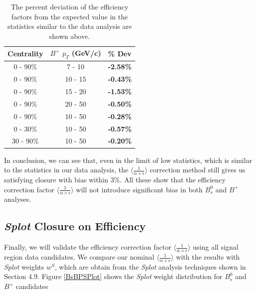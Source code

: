 \begin{table}[h]
\begin{center}
\caption{The  percent deviation of the efficiency factors from the expected value in the statistics similar to the data analysis are shown above.}
\vspace{1em}
\label{BPEffClosure}
  \begin{tabular}{| c | c |c |}
    \hline
     Centrality &   $B^+$  $p_T$ (GeV/c) &   \% Dev \\
    \hline
    \hline
0 - 90\% & 7 - 10 &  \textbf{-2.58\% }   \\ 
0 - 90\% & 10 - 15 &  \textbf{-0.43\% }   \\ 
0 - 90\% & 15 - 20 &   \textbf{-1.53\% }   \\ 
0 - 90\% & 20 - 50 &  \textbf{-0.50\% }   \\ 
0 - 90\% & 10 - 50 &  \textbf{-0.28\% }   \\ 
0 - 30\% & 10 - 50 &   \textbf{-0.57\% }   \\ 
30 - 90\% & 10 - 50 & \textbf{-0.20\% }   \\ 
    \hline
    \hline
\end{tabular}
\end{center}
\end{table}


In conclusion, we can see that, even in the limit of low statistics, which is similar to the statistics in our data analysis, the $\langle \frac{1}{\alpha \times \epsilon} \rangle$ correction method still gives us satisfying closure with bias within 3\%. All these show that the efficiency correction factor $\langle \frac{1}{\alpha \times \epsilon} \rangle$ will not introduce significant bias in both $B^0_s$ and $B^+$ analyses.


\subsection{\textit{Splot} Closure on Efficiency}

Finally, we will validate the efficiency correction factor $\langle \frac{1}{\alpha \times \epsilon} \rangle$ using all signal region data candidates. We compare our nominal $\langle \frac{1}{\alpha \times \epsilon} \rangle$ with the results with \textit{Splot} weights $w^S$, which are obtain from the \textit{Splot} analysis techniques shown in Section 4.9. Figure \ref{BsBPSPlot} shows the \textit{Splot} weight distribution for $B^0_s$ and $B^+$ candidates  

